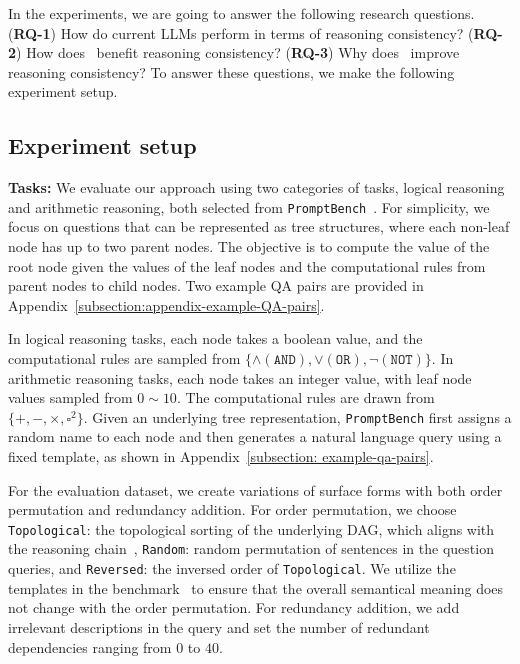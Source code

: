 % 

In the experiments, we are going to answer the following research questions. (\textbf{RQ-1}) How do current LLMs perform in terms of reasoning consistency?
(\textbf{RQ-2}) How does \method\ benefit reasoning consistency?
(\textbf{RQ-3}) Why does \method\ improve reasoning consistency?
To answer these questions, we make the following experiment setup.


\subsection{Experiment setup}
\textbf{Tasks:} We evaluate our approach using two categories of tasks, logical reasoning and arithmetic reasoning, both selected from \texttt{PromptBench}~\citep{zhu2023dyval}. For simplicity, we focus on questions that can be represented as tree structures, where each non-leaf node has up to two parent nodes. The objective is to compute the value of the root node given the values of the leaf nodes and the computational rules from parent nodes to child nodes. Two example QA pairs are provided in Appendix~\ref{subsection:appendix-example-QA-pairs}.

In logical reasoning tasks, each node takes a boolean value, and the computational rules are sampled from $\{ \land (\texttt{AND}), \lor (\texttt{OR}), \neg(\texttt{NOT}) \}$. In arithmetic reasoning tasks, each node takes an integer value, with leaf node values sampled from $0\sim10$. The computational rules are drawn from $\{ +, -, \times, \square^2\}$. Given an underlying tree representation, \texttt{PromptBench} first assigns a random name to each node and then generates a natural language query using a fixed template, as shown in Appendix~\ref{subsection: example-qa-pairs}.

For the evaluation dataset, we create variations of surface forms with both order permutation and redundancy addition. For order permutation, we choose \texttt{Topological}: the topological sorting of the underlying DAG, which aligns with the reasoning chain~\citep{zhu2023dyval}, \texttt{Random}: random permutation of sentences in the question queries, and \texttt{Reversed}: the inversed order of \texttt{Topological}. We utilize the templates in the benchmark~\citep{zhu2023dyval} to ensure that the overall semantical meaning does not change with the order permutation. For redundancy addition, we add irrelevant descriptions in the query and set the number of redundant dependencies ranging from $0$ to $40$.

